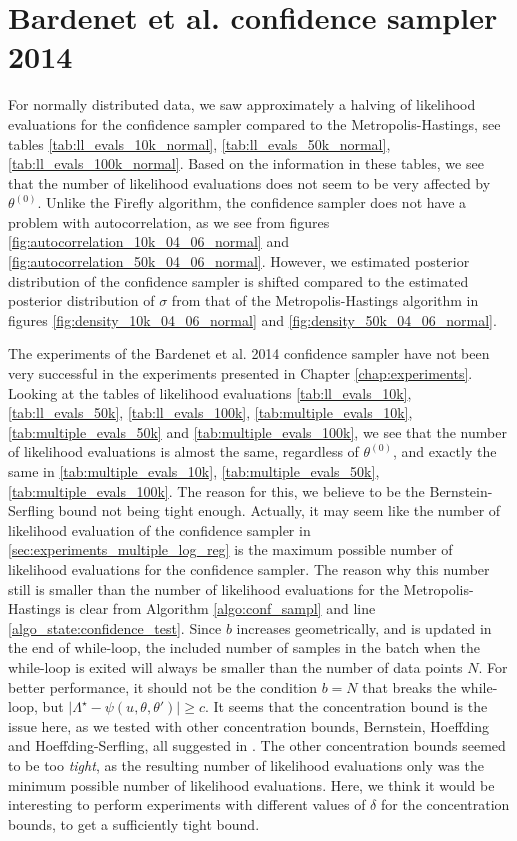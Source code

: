 \section{Bardenet et al. confidence sampler 2014}
For normally distributed data, we saw approximately a halving of likelihood evaluations for the confidence sampler compared to the Metropolis-Hastings, see tables \ref{tab:ll_evals_10k_normal}, \ref{tab:ll_evals_50k_normal}, \ref{tab:ll_evals_100k_normal}. Based on the information in these tables, we see that the number of likelihood evaluations does not seem to be very affected by $\theta^{\left(0\right)}$. Unlike the Firefly algorithm, the confidence sampler does not have a problem with autocorrelation, as we see from figures \ref{fig:autocorrelation_10k_04_06_normal} and \ref{fig:autocorrelation_50k_04_06_normal}. However, we estimated posterior distribution of the confidence sampler is shifted compared to the estimated posterior distribution of $\sigma$ from that of the Metropolis-Hastings algorithm in figures \ref{fig:density_10k_04_06_normal} and \ref{fig:density_50k_04_06_normal}. 


The experiments of the Bardenet et al. 2014 confidence sampler have not been very successful in the experiments presented in Chapter \ref{chap:experiments}. Looking at the tables of likelihood evaluations \ref{tab:ll_evals_10k}, \ref{tab:ll_evals_50k}, \ref{tab:ll_evals_100k}, \ref{tab:multiple_evals_10k}, \ref{tab:multiple_evals_50k} and  \ref{tab:multiple_evals_100k}, we see that the number of likelihood evaluations is almost the same, regardless of $\theta^{\left(0\right)}$, and exactly the same in \ref{tab:multiple_evals_10k}, \ref{tab:multiple_evals_50k}, \ref{tab:multiple_evals_100k}. The reason for this, we believe to be the Bernstein-Serfling bound not being tight enough. Actually, it may seem like the number of likelihood evaluation of the confidence sampler in \ref{sec:experiments_multiple_log_reg} is the maximum possible number of likelihood evaluations for the confidence sampler. The reason why this number still is smaller than the number of likelihood evaluations for the Metropolis-Hastings is clear from Algorithm \ref{algo:conf_sampl} and line \ref{algo_state:confidence_test}. Since $b$ increases geometrically, and is updated in the end of while-loop, the included number of samples in the batch when the while-loop is exited will always be smaller than the number of data points $N$. For better performance, it should not be the condition $b = N$ that breaks the while-loop, but $\mid \Lambda
^{\star}- \psi\left(u, \theta, \theta'\right)\mid \geq c$. It seems that the concentration bound is the issue here, as we tested with other concentration bounds, Bernstein, Hoeffding and Hoeffding-Serfling, all suggested in \cite{bardenet2015concentration}. The other concentration bounds seemed to be too \textit{tight}, as the resulting number of likelihood evaluations only was the minimum possible number of likelihood evaluations. Here, we think it would be interesting to perform experiments with different values of $\delta$ for the concentration bounds, to get a sufficiently tight bound. 


